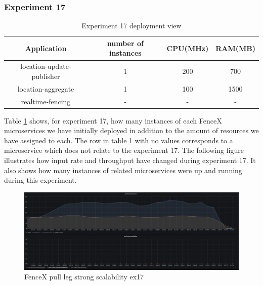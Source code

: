 \documentclass[a4]{report}
\begin{document}
    \subsubsection{Experiment 17}
    \begin{table}[h!]
        \centering
        \begin{tabular}{|c|c|c|c|}
            \hline
            Application               & number of instances & CPU(MHz) & RAM(MB) \\
            \hline
            location-update-publisher & 1                   & 200      & 700     \\
            location-aggregate        & 1                   & 100      & 1500    \\
            realtime-fencing          & -                   & -        & -       \\
            \hline
        \end{tabular}
        \caption{Experiment 17 deployment view}
        \label{table:ex17-dv}
    \end{table}

    Table \ref{table:ex17-dv} shows, for experiment 17, how many instances of each FenceX microservices we have
    initially deployed in addition to the amount of resources we have assigned to each.
    The row in table \ref{table:ex17-dv} with no values corresponds to a microservice which does not relate to the
    experiment 17.
    The following figure illustrates how input rate and throughput have changed during experiment 17.
    It also shows how many instances of related microservices were up and running during this experiment.

    \begin{figure}
        \caption{FenceX pull leg strong scalability ex17}
        \label{fig:ex17}
        \includegraphics[scale=0.5]{images/evaluation/ex17-benchmarking-ongoing-2per4sec.png}
    \end{figure}

    \clearpage
\end{document}

